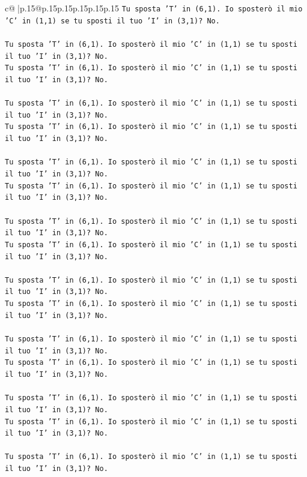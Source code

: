 \documentclass{article}
\begin{document}
{\begin{supertabular}{c@{$\;$}|p{.15\linewidth}@{}p{.15\linewidth}p{.15\linewidth}p{.15\linewidth}p{.15\linewidth}p{.15\linewidth}}
{{{\texttt{Tu sposta 'T' in (6,1). Io sposterò il mio 'C' in (1,1) se tu sposti il tuo 'I' in (3,1)? No.} \\
\\ 
\texttt{Tu sposta 'T' in (6,1). Io sposterò il mio 'C' in (1,1) se tu sposti il tuo 'I' in (3,1)? No.} \\
\texttt{Tu sposta 'T' in (6,1). Io sposterò il mio 'C' in (1,1) se tu sposti il tuo 'I' in (3,1)? No.} \\
\\ 
\texttt{Tu sposta 'T' in (6,1). Io sposterò il mio 'C' in (1,1) se tu sposti il tuo 'I' in (3,1)? No.} \\
\texttt{Tu sposta 'T' in (6,1). Io sposterò il mio 'C' in (1,1) se tu sposti il tuo 'I' in (3,1)? No.} \\
\\ 
\texttt{Tu sposta 'T' in (6,1). Io sposterò il mio 'C' in (1,1) se tu sposti il tuo 'I' in (3,1)? No.} \\
\texttt{Tu sposta 'T' in (6,1). Io sposterò il mio 'C' in (1,1) se tu sposti il tuo 'I' in (3,1)? No.} \\
\\ 
\texttt{Tu sposta 'T' in (6,1). Io sposterò il mio 'C' in (1,1) se tu sposti il tuo 'I' in (3,1)? No.} \\
\texttt{Tu sposta 'T' in (6,1). Io sposterò il mio 'C' in (1,1) se tu sposti il tuo 'I' in (3,1)? No.} \\
\\ 
\texttt{Tu sposta 'T' in (6,1). Io sposterò il mio 'C' in (1,1) se tu sposti il tuo 'I' in (3,1)? No.} \\
\texttt{Tu sposta 'T' in (6,1). Io sposterò il mio 'C' in (1,1) se tu sposti il tuo 'I' in (3,1)? No.} \\
\\ 
\texttt{Tu sposta 'T' in (6,1). Io sposterò il mio 'C' in (1,1) se tu sposti il tuo 'I' in (3,1)? No.} \\
\texttt{Tu sposta 'T' in (6,1). Io sposterò il mio 'C' in (1,1) se tu sposti il tuo 'I' in (3,1)? No.} \\
\\ 
\texttt{Tu sposta 'T' in (6,1). Io sposterò il mio 'C' in (1,1) se tu sposti il tuo 'I' in (3,1)? No.} \\
\texttt{Tu sposta 'T' in (6,1). Io sposterò il mio 'C' in (1,1) se tu sposti il tuo 'I' in (3,1)? No.} \\
\\ 
\texttt{Tu sposta 'T' in (6,1). Io sposterò il mio 'C' in (1,1) se tu sposti il tuo 'I' in (3,1)? No.} \\
}}}
\end{supertabular}}
\end{document}
